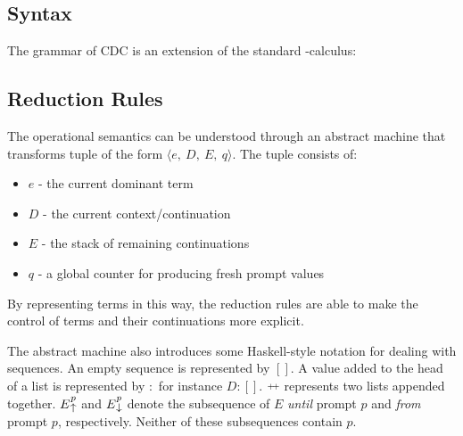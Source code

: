   \subsection{Syntax}
  The grammar of CDC is an extension of the standard \lam-calculus:

  \begin{figure}[!h]
  \end{figure}

  \subsection{Reduction Rules}
  
  The operational semantics can be understood through an abstract machine that transforms tuple of the form $\langle e,\ D,\ E,\ q \rangle$.
  The tuple consists of:
    \begin{itemize}
      \item $e$ - the current dominant term
      \item $D$ - the current context/continuation
      \item $E$ - the stack of remaining continuations
      \item $q$ - a global counter for producing fresh prompt values
    \end{itemize}
  By representing terms in this way, 
  the reduction rules are able to make the control of terms and their continuations more explicit.
  
  The abstract machine also introduces some Haskell-style notation for dealing with sequences. An empty sequence is represented by $[]$. 
  A value added to the head of a list is represented by $:$ for instance $D:[]$. $\app$ represents two lists appended together. 
  $E\until{p}$ and $E\from{p}$ denote the subsequence of $E$ \emph{until} prompt $p$ and \emph{from} prompt $p$, respectively. 
  Neither of these subsequences contain $p$.

